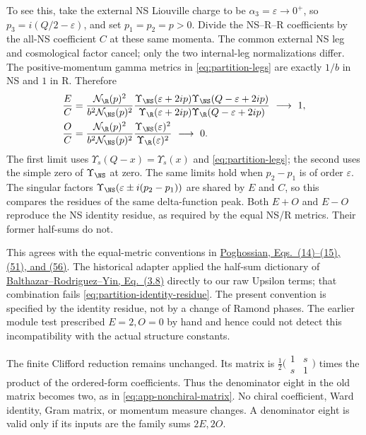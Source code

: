 To see this, take the external NS Liouville charge to be
$\alpha_3=\varepsilon\to0^+$, so
$p_3=i(Q/2-\varepsilon)$, and set $p_1=p_2=p>0$.
Divide the NS--R--R coefficients by the all-NS coefficient $C$ at
these same momenta. The common external NS leg and cosmological
factor cancel; only the two internal-leg normalizations differ.
The positive-momentum gamma metrics in \eqref{eq:partition-legs}
are exactly $1/b$ in NS and $1$ in R. Therefore
\begin{align}
 \frac{E}{C}&=
 \frac{\mathcal N_{\R}(p)^2}{b^2\mathcal N_{\NS}(p)^2}
 \frac{\Upsilon_{\NS}(\varepsilon+2ip)
       \Upsilon_{\NS}(Q-\varepsilon+2ip)}
      {\Upsilon_{\R}(\varepsilon+2ip)
       \Upsilon_{\R}(Q-\varepsilon+2ip)}
 \ \longrightarrow\ 1,\nonumber\\
 \frac{O}{C}&=
 \frac{\mathcal N_{\R}(p)^2}{b^2\mathcal N_{\NS}(p)^2}
 \frac{\Upsilon_{\NS}(\varepsilon)^2}
      {\Upsilon_{\R}(\varepsilon)^2}
 \ \longrightarrow\ 0.
 \label{eq:partition-identity-residue}
\end{align}
The first limit uses $\Upsilon_s(Q-x)=\Upsilon_s(x)$ and
\eqref{eq:partition-legs}; the second uses the simple zero of
$\Upsilon_{\NS}$ at zero. The same limits hold when $p_2-p_1$ is
of order $\varepsilon$. The singular factors
$\Upsilon_{\NS}(\varepsilon\pm i(p_2-p_1))$ are shared by $E$
and $C$, so this compares the residues of the same delta-function
peak. Both $E+O$ and $E-O$ reproduce the NS identity residue, as
required by the equal NS/R metrics. Their former half-sums do not.

This agrees with the equal-metric conventions in
\href{https://arxiv.org/pdf/hep-th/9607120}{Poghossian,
Eqs.~(14)--(15), (51), and (56)}. The historical adapter applied
the half-sum dictionary of
\href{https://arxiv.org/html/2201.05621\#S3.SS1}{Balthazar--Rodriguez--Yin,
Eq.~(3.8)} directly to our raw Upsilon terms; that combination fails
\eqref{eq:partition-identity-residue}. The present convention is
specified by the identity residue, not by a change of Ramond phases.
The earlier module test prescribed $E=2,O=0$ by hand and hence could
not detect this incompatibility with the actual structure constants.

The finite Clifford reduction remains unchanged. Its matrix is
$\tfrac12\bigl(\begin{smallmatrix}1&s\\s&1\end{smallmatrix}\bigr)$
times the product of the ordered-form coefficients. Thus the
denominator eight in the old matrix becomes two, as in
\eqref{eq:app-nonchiral-matrix}. No chiral coefficient, Ward identity,
Gram matrix, or momentum measure changes. A denominator eight is
valid only if its inputs are the family sums $2E,2O$.

